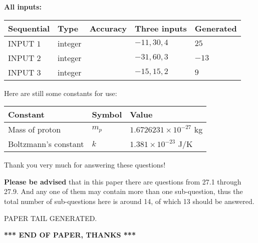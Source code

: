 \documentclass[12pt]{article}
\begin{document}
   
   
   
\noindent\vspace{0.1in}\hspace{-0.08in} {\textbf{\Large{All inputs: }}}
   
   
  
  
\noindent\begin{tabular}{|l|l|l|l|l|}
\hline
 Sequential & Type & Accuracy & Three inputs & Generated \\ 
\hline
 
 
  INPUT $           1$ & integer &  & $
 -11
 , 
 30
 , 
 4
 $ & $ 25 $ 
 \\  \hline  
 
 
  INPUT $           2$ & integer &  & $
 -31
 , 
 60
 , 
 3
 $ & $ -13 $ 
 \\  \hline  
 
 
  INPUT $           3$ & integer &  & $
 -15
 , 
 15
 , 
 2
 $ & $ 9 $ 
 \\  \hline  
 \end{tabular}
   
   
   
   
   
   
 \vspace{0.2in}
Here are still some constants for use:
 
 
\noindent\begin{tabular}{|l|l|l|}
\hline
Constant & Symbol & Value \\
\hline
 
Mass of proton &
$m_p$ &
 $ 1.6726231 \times 10^{-27} $
kg \\
\hline
 
Boltzmann's constant &
$k$ &
 $ 1.381 \times 10^{-23} $
J/K \\
\hline
 
\end{tabular}
 
Thank you very much for answering these questions!
 
{\textbf{\large{Please be advised}}} that in this paper there are questions from
27.1 through
27.9.
And any one of them may contain more than one sub-question, thus the total number
of sub-questions here is around 14, of which
13 should be answered.
 
   
   
\vspace{2.0in} PAPER TAIL GENERATED.
   
   
   
   
\vspace{1.0in} 
{\textbf{\large{ *** END OF PAPER, THANKS *** }}} 
   
\end{document}
